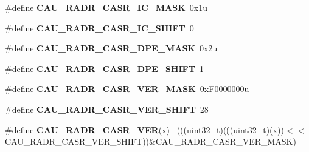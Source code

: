\begin{DoxyCompactItemize}
\item 
\hypertarget{group___c_a_u___register___masks_ga8b83182cdf0c23dd0359bdd4bde2e770}{}\#define {\bfseries C\+A\+U\+\_\+\+R\+A\+D\+R\+\_\+\+C\+A\+S\+R\+\_\+\+I\+C\+\_\+\+M\+A\+S\+K}~0x1u\label{group___c_a_u___register___masks_ga8b83182cdf0c23dd0359bdd4bde2e770}

\item 
\hypertarget{group___c_a_u___register___masks_gaaaed76b153aa3db1dd33853bd41f890f}{}\#define {\bfseries C\+A\+U\+\_\+\+R\+A\+D\+R\+\_\+\+C\+A\+S\+R\+\_\+\+I\+C\+\_\+\+S\+H\+I\+F\+T}~0\label{group___c_a_u___register___masks_gaaaed76b153aa3db1dd33853bd41f890f}

\item 
\hypertarget{group___c_a_u___register___masks_gae77a40261939bae263003192796104ac}{}\#define {\bfseries C\+A\+U\+\_\+\+R\+A\+D\+R\+\_\+\+C\+A\+S\+R\+\_\+\+D\+P\+E\+\_\+\+M\+A\+S\+K}~0x2u\label{group___c_a_u___register___masks_gae77a40261939bae263003192796104ac}

\item 
\hypertarget{group___c_a_u___register___masks_ga29f9fdde7f5d91e78a00e02dc66d90ce}{}\#define {\bfseries C\+A\+U\+\_\+\+R\+A\+D\+R\+\_\+\+C\+A\+S\+R\+\_\+\+D\+P\+E\+\_\+\+S\+H\+I\+F\+T}~1\label{group___c_a_u___register___masks_ga29f9fdde7f5d91e78a00e02dc66d90ce}

\item 
\hypertarget{group___c_a_u___register___masks_ga93d73e487a9f7e0f78ff89b8c2162099}{}\#define {\bfseries C\+A\+U\+\_\+\+R\+A\+D\+R\+\_\+\+C\+A\+S\+R\+\_\+\+V\+E\+R\+\_\+\+M\+A\+S\+K}~0x\+F0000000u\label{group___c_a_u___register___masks_ga93d73e487a9f7e0f78ff89b8c2162099}

\item 
\hypertarget{group___c_a_u___register___masks_ga9b9d89d85aab94d1cf9066dcdc9f80b3}{}\#define {\bfseries C\+A\+U\+\_\+\+R\+A\+D\+R\+\_\+\+C\+A\+S\+R\+\_\+\+V\+E\+R\+\_\+\+S\+H\+I\+F\+T}~28\label{group___c_a_u___register___masks_ga9b9d89d85aab94d1cf9066dcdc9f80b3}

\item 
\hypertarget{group___c_a_u___register___masks_gae53799d1ea916b1948df59d65629614b}{}\#define {\bfseries C\+A\+U\+\_\+\+R\+A\+D\+R\+\_\+\+C\+A\+S\+R\+\_\+\+V\+E\+R}(x)                                      ~(((uint32\+\_\+t)(((uint32\+\_\+t)(x))$<$$<$C\+A\+U\+\_\+\+R\+A\+D\+R\+\_\+\+C\+A\+S\+R\+\_\+\+V\+E\+R\+\_\+\+S\+H\+I\+F\+T))\&C\+A\+U\+\_\+\+R\+A\+D\+R\+\_\+\+C\+A\+S\+R\+\_\+\+V\+E\+R\+\_\+\+M\+A\+S\+K)\label{group___c_a_u___register___masks_gae53799d1ea916b1948df59d65629614b}


\end{DoxyCompactItemize}
